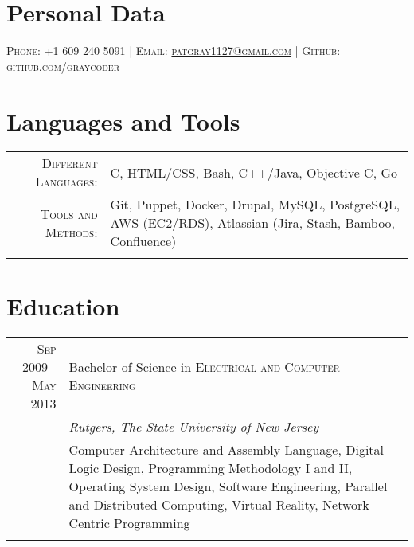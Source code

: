 \documentclass[a4paper, 10pt, onepage]{article} %
\begin{document}
\pagestyle{empty} 
\par{\par}
\par{\par}
\section{Personal Data}
\centering\textsc{{Phone:} +1 609 240 5091 | {Email:}  \href{mailto:patgray1127@gmail.com}{patgray1127@gmail.com} | {Github:}  \href{http://github.com/graycoder}{github.com/graycoder}}\\
\section{Languages and Tools}
\begin{tabular}{rp{10cm}}
\textsc{Different Languages:} & C, HTML/CSS, Bash, C++/Java, Objective C, Go\\
\textsc{Tools and Methods:} & Git, Puppet, Docker, Drupal, MySQL, PostgreSQL, AWS (EC2/RDS), Atlassian (Jira, Stash, Bamboo, Confluence)\\
\multicolumn{2}{c}{}\\
\end{tabular}
\section{Education}
\begin{tabular}{r|p{10cm}}	
\textsc{Sep 2009 - May 2013} & Bachelor of Science in \textsc{Electrical and Computer Engineering}\\
& \small\emph{Rutgers, The State University of New Jersey}\\
& \footnotesize{Computer Architecture and Assembly Language, Digital Logic Design, Programming Methodology I and II, Operating System Design, Software Engineering, Parallel and Distributed Computing, Virtual Reality, Network Centric Programming}\\
\multicolumn{2}{c}{}\\
\end{tabular}
\end{document}
